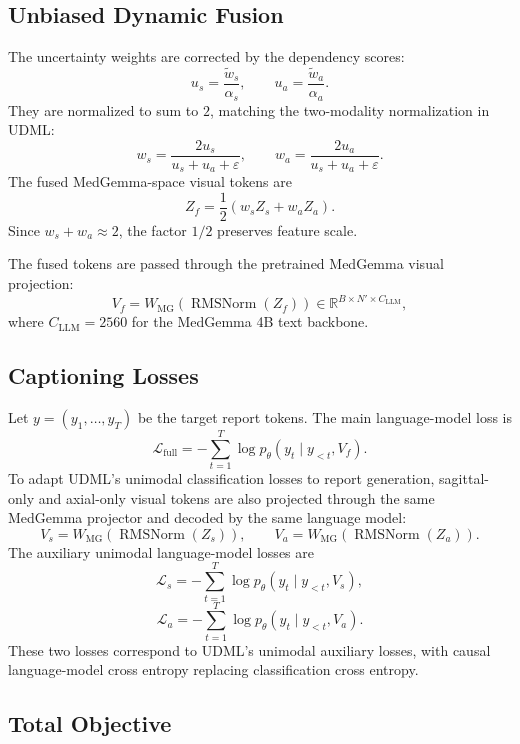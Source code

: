 \subsection{Unbiased Dynamic Fusion}

The uncertainty weights are corrected by the dependency scores:
\[
    u_s = \frac{\tilde{w}_s}{\alpha_s},
    \qquad
    u_a = \frac{\tilde{w}_a}{\alpha_a}.
\]
They are normalized to sum to \(2\), matching the two-modality normalization in UDML:
\[
    w_s
    =
    \frac{2u_s}{u_s+u_a+\varepsilon},
    \qquad
    w_a
    =
    \frac{2u_a}{u_s+u_a+\varepsilon}.
\]
The fused MedGemma-space visual tokens are
\[
    Z_f
    =
    \frac{1}{2}
    \left(
        w_s Z_s + w_a Z_a
    \right).
\]
Since \(w_s+w_a \approx 2\), the factor \(1/2\) preserves feature scale.

The fused tokens are passed through the pretrained MedGemma visual projection:
\[
    V_f
    =
    W_{\text{MG}}
    \left(
        \operatorname{RMSNorm}(Z_f)
    \right)
    \in \mathbb{R}^{B \times N' \times C_{\text{LLM}}},
\]
where \(C_{\text{LLM}}=2560\) for the MedGemma 4B text backbone.

\subsection{Captioning Losses}

Let \(y=(y_1,\ldots,y_T)\) be the target report tokens. The main language-model loss is
\[
    \mathcal{L}_{\text{full}}
    =
    -\sum_{t=1}^{T}
    \log p_{\theta}
    \left(
        y_t
        \mid
        y_{<t}, V_f
    \right).
\]
To adapt UDML's unimodal classification losses to report generation, sagittal-only and axial-only visual tokens are also projected through the same MedGemma projector and decoded by the same language model:
\[
    V_s
    =
    W_{\text{MG}}
    \left(
        \operatorname{RMSNorm}(Z_s)
    \right),
    \qquad
    V_a
    =
    W_{\text{MG}}
    \left(
        \operatorname{RMSNorm}(Z_a)
    \right).
\]
The auxiliary unimodal language-model losses are
\[
    \mathcal{L}_{s}
    =
    -\sum_{t=1}^{T}
    \log p_{\theta}
    \left(
        y_t
        \mid
        y_{<t}, V_s
    \right),
\]
\[
    \mathcal{L}_{a}
    =
    -\sum_{t=1}^{T}
    \log p_{\theta}
    \left(
        y_t
        \mid
        y_{<t}, V_a
    \right).
\]
These two losses correspond to UDML's unimodal auxiliary losses, with causal language-model cross entropy replacing classification cross entropy.

\subsection{Total Objective}


